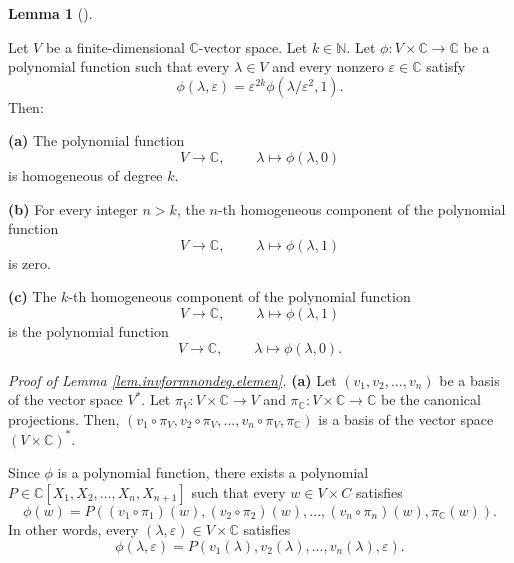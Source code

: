 \documentclass
[numbers=enddot,12pt,final,onecolumn,german,notitlepage]{scrartcl}%
\theoremstyle{definition}
\newtheorem{lem}[theo]{Lemma}
\newenvironment{lemma}[1][]
{\begin{lem}[#1]\begin{leftbar}}
{\end{leftbar}\end{lem}}
\begin{document}
\begin{lemma}
\label{lem.invformnondeg.elemen}Let $V$ be a finite-dimensional $\mathbb{C}%
$-vector space. Let $k\in\mathbb{N}$. Let $\phi:V\times\mathbb{C}%
\rightarrow\mathbb{C}$ be a polynomial function such that every $\lambda\in V$
and every nonzero $\varepsilon\in\mathbb{C}$ satisfy%
\[
\phi\left(  \lambda,\varepsilon\right)  =\varepsilon^{2k}\phi\left(
\lambda/\varepsilon^{2},1\right)  .
\]
Then:

\textbf{(a)} The polynomial function
\[
V\rightarrow\mathbb{C},\ \ \ \ \ \ \ \ \ \ \lambda\mapsto\phi\left(
\lambda,0\right)
\]
is homogeneous of degree $k$.

\textbf{(b)} For every integer $n>k$, the $n$-th homogeneous component of the
polynomial function%
\[
V\rightarrow\mathbb{C},\ \ \ \ \ \ \ \ \ \ \lambda\mapsto\phi\left(
\lambda,1\right)
\]
is zero.

\textbf{(c)} The $k$-th homogeneous component of the polynomial function%
\[
V\rightarrow\mathbb{C},\ \ \ \ \ \ \ \ \ \ \lambda\mapsto\phi\left(
\lambda,1\right)
\]
is the polynomial function%
\[
V\rightarrow\mathbb{C},\ \ \ \ \ \ \ \ \ \ \lambda\mapsto\phi\left(
\lambda,0\right)  .
\]

\end{lemma}

\textit{Proof of Lemma \ref{lem.invformnondeg.elemen}.} \textbf{(a)} Let
$\left(  v_{1},v_{2},...,v_{n}\right)  $ be a basis of the vector space
$V^{\ast}$. Let $\pi_{V}:V\times\mathbb{C}\rightarrow V$ and $\pi_{\mathbb{C}%
}:V\times\mathbb{C}\rightarrow\mathbb{C}$ be the canonical projections. Then,
$\left(  v_{1}\circ\pi_{V},v_{2}\circ\pi_{V},...,v_{n}\circ\pi_{V}%
,\pi_{\mathbb{C}}\right)  $ is a basis of the vector space $\left(
V\times\mathbb{C}\right)  ^{\ast}$.

Since $\phi$ is a polynomial function, there exists a polynomial
$P\in\mathbb{C}\left[  X_{1},X_{2},...,X_{n},X_{n+1}\right]  $ such that every
$w\in V\times C$ satisfies%
\[
\phi\left(  w\right)  =P\left(  \left(  v_{1}\circ\pi_{1}\right)  \left(
w\right)  ,\left(  v_{2}\circ\pi_{2}\right)  \left(  w\right)  ,...,\left(
v_{n}\circ\pi_{n}\right)  \left(  w\right)  ,\pi_{\mathbb{C}}\left(  w\right)
\right)  .
\]
In other words, every $\left(  \lambda,\varepsilon\right)  \in V\times
\mathbb{C}$ satisfies%
\begin{equation}
\phi\left(  \lambda,\varepsilon\right)  =P\left(  v_{1}\left(  \lambda\right)
,v_{2}\left(  \lambda\right)  ,...,v_{n}\left(  \lambda\right)  ,\varepsilon
\right)  . \label{pf.invformnondeg.elemen.1}%
\end{equation}
\end{document}
